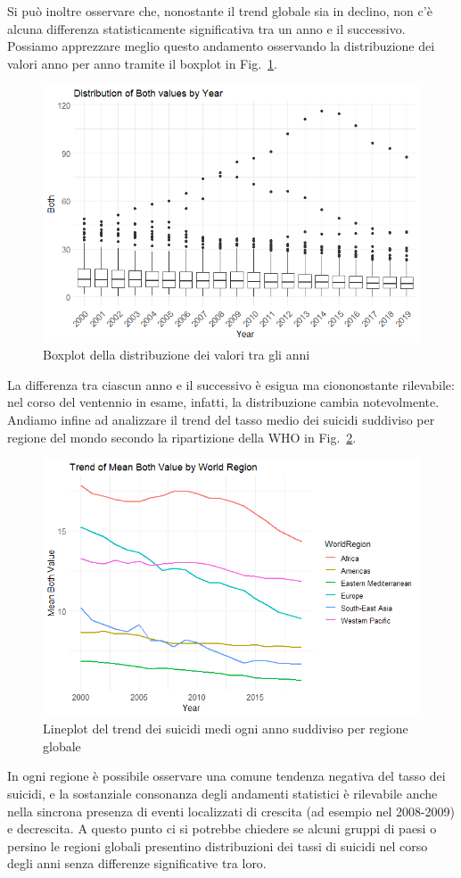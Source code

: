 \documentclass[conference]{IEEEtran}
\begin{document}
Si può inoltre osservare
che, nonostante il trend globale sia in declino, non c'è alcuna differenza
statisticamente significativa tra un anno e il successivo.
Possiamo apprezzare meglio questo andamento 
osservando la distribuzione dei valori anno per anno tramite il boxplot
in Fig.~\ref{3boxyears}.
\begin{figure}[htbp]
    \centerline{\includegraphics[width=.5\textwidth]{img/3 - Boxyears2.png}}
    \caption{Boxplot della distribuzione dei valori tra gli anni}
    \label{3boxyears}
\end{figure}
La differenza tra ciascun anno e il successivo è esigua ma ciononostante rilevabile: nel corso del ventennio
in esame, infatti, la distribuzione cambia notevolmente.
Andiamo infine ad analizzare il trend del tasso medio dei suicidi suddiviso
per regione del mondo secondo la ripartizione della WHO in Fig.~\ref{4wrtrend}.

\begin{figure}[htbp]
    \centerline{\includegraphics[width=.5\textwidth]{img/4 - WRTrend2.png}}
    \caption{Lineplot del trend dei suicidi medi ogni anno suddiviso per regione globale}
    \label{4wrtrend}
\end{figure}

In ogni regione è possibile osservare una comune tendenza negativa
del tasso dei suicidi, e la sostanziale consonanza degli andamenti statistici
è rilevabile anche nella sincrona presenza di eventi localizzati di crescita
(ad esempio nel 2008-2009) e decrescita.
A questo punto ci si potrebbe chiedere se alcuni gruppi
di paesi o persino le regioni globali presentino
distribuzioni dei tassi di suicidi nel corso degli anni
senza differenze significative tra loro.
\end{document}
